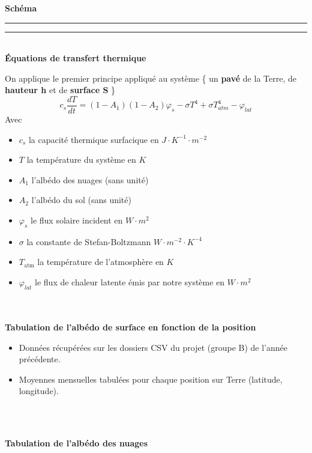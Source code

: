 \documentclass[a4paper,12pt]{article}
\begin{document}

\textbf{Schéma}
\\

\noindent\textcolor{gray}{\rule{\linewidth}{0.4pt}}

    
\begin{center}
  
\end{center}
\noindent\textcolor{gray}{\rule{\linewidth}{0.4pt}}
\vspace{0.5cm}
\\
\textbf{Équations de transfert thermique}


On applique le premier principe appliqué au système \{ un \textbf{pavé} de la Terre, de \textbf{hauteur h} et de \textbf{surface S} \}
\ \ 
\[
\boxed{c_s \frac{dT}{dt} =(1-A_1)(1-A_2)\varphi_s-\sigma T^4+\sigma T_{atm}^4-\varphi_{lat}}
\]
Avec
\begin{itemize}
    \item \(c_s\) la capacité thermique surfacique en \(J\cdot K^{-1}\cdot m^{-2}\)
     \item  \(T\) la température du système en \(K\)
    \item \(A_1\) l'albédo des nuages (sans unité)
    \item \(A_2\) l'albédo du sol (sans unité)
    \item \(\varphi_s\) le flux solaire incident en \(W \cdot m^2\)
 \item \(\sigma\) la constante de Stefan-Boltzmann \(W \cdot m^{-2} \cdot K^{-4}\)
    \item \(T_\text{atm}\) la température de l'atmosphère en \(K\)    
    
    \item \(\varphi_{lat}\) le flux de chaleur latente émis par notre système en \(W \cdot m^2\)
\end{itemize}



\vspace{0.5cm}
\\
\\
\textbf{Tabulation de l'albédo de surface en fonction de la position}

\begin{itemize}
    \item Données récupérées sur les dossiers CSV du projet (groupe B) de l'année précédente.
    \item Moyennes mensuelles tabulées pour chaque position sur Terre (latitude, longitude).
\end{itemize}
\\
\\
\textbf{Tabulation de l'albédo des nuages}
\end{document}
